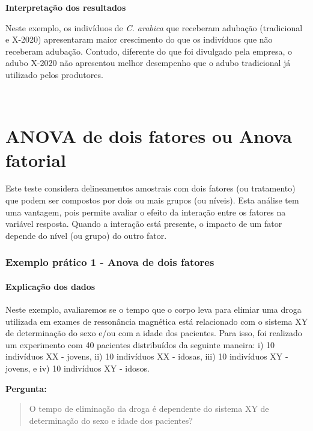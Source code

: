 \documentclass[
]{book}
\begin{document}
\textbf{Interpretação dos resultados}

Neste exemplo, os indivíduos de \emph{C. arabica} que receberam adubação (tradicional e X-2020) apresentaram maior crescimento do que os indivíduos que não receberam adubação. Contudo, diferente do que foi divulgado pela empresa, o adubo X-2020 não apresentou melhor desempenho que o adubo tradicional já utilizado pelos produtores.

~

\hypertarget{anova-de-dois-fatores-ou-anova-fatorial}{%
\section{ANOVA de dois fatores ou Anova fatorial}\label{anova-de-dois-fatores-ou-anova-fatorial}}

Este teste considera delineamentos amostrais com dois fatores (ou tratamento) que podem ser compostos por dois ou mais grupos (ou níveis). Esta análise tem uma vantagem, pois permite avaliar o efeito da interação entre os fatores na variável resposta. Quando a interação está presente, o impacto de um fator depende do nível (ou grupo) do outro fator.

\hypertarget{exemplo-pruxe1tico-1---anova-de-dois-fatores}{%
\subsubsection{Exemplo prático 1 - Anova de dois fatores}\label{exemplo-pruxe1tico-1---anova-de-dois-fatores}}

\hypertarget{explicauxe7uxe3o-dos-dados-7}{%
\paragraph{Explicação dos dados}\label{explicauxe7uxe3o-dos-dados-7}}

Neste exemplo, avaliaremos se o tempo que o corpo leva para elimiar uma droga utilizada em exames de ressonância magnética está relacionado com o sistema XY de determinação do sexo e/ou com a idade dos pacientes. Para isso, foi realizado um experimento com 40 pacientes distribuídos da seguinte maneira: i) 10 indivíduos XX - jovens, ii) 10 indivíduos XX - idosas, iii) 10 indivíduos XY - jovens, e iv) 10 indivíduos XY - idosos.

\textbf{Pergunta:}

\begin{quote}
O tempo de eliminação da droga é dependente do sistema XY de determinação do sexo e idade dos pacientes?
\end{quote}
\end{document}
